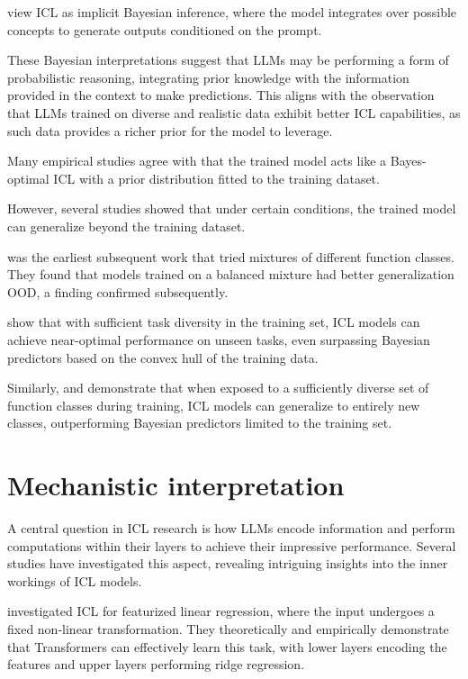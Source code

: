 \documentclass[12pt]{article}
\begin{document}
\cite{xieExplanationIncontextLearning2022} view ICL as implicit Bayesian inference, where the model integrates over possible concepts to generate outputs conditioned on the prompt.

These Bayesian interpretations suggest that LLMs may be performing a form of probabilistic reasoning, integrating prior knowledge with the information provided in the context to make predictions. This aligns with the observation that LLMs trained on diverse and realistic data exhibit better ICL capabilities, as such data provides a richer prior for the model to leverage.

Many empirical studies agree with \cite{gargWhatCanTransformers2022} that the trained model acts like a Bayes-optimal ICL with a prior distribution fitted to the training dataset.

However, several studies showed that under certain conditions, the trained model can generalize beyond the training dataset.

\cite{yadlowskyPretrainingDataMixtures2023} was the earliest subsequent work that tried mixtures of different function classes. They found that models trained on a balanced mixture had better generalization OOD, a finding confirmed subsequently.

\cite{raventosPretrainingTaskDiversity2024} show that with sufficient task diversity in the training set, ICL models can achieve near-optimal performance on unseen tasks, even surpassing Bayesian predictors based on the convex hull of the training data.

Similarly, \cite{panwarSurprisingDeviationsBayesian2023} and \cite{panwarInContextLearningBayesian2024} demonstrate that when exposed to a sufficiently diverse set of function classes during training, ICL models can generalize to entirely new classes, outperforming Bayesian predictors limited to the training set.

\section{Mechanistic interpretation}

A central question in ICL research is how LLMs encode information and perform computations within their layers to achieve their impressive performance. Several studies have investigated this aspect, revealing intriguing insights into the inner workings of ICL models.


\cite{guoHowTransformersLearn2023} investigated ICL for featurized linear regression, where the input undergoes a fixed non-linear transformation. They theoretically and empirically demonstrate that Transformers can effectively learn this task, with lower layers encoding the features and upper layers performing ridge regression.
\end{document}

